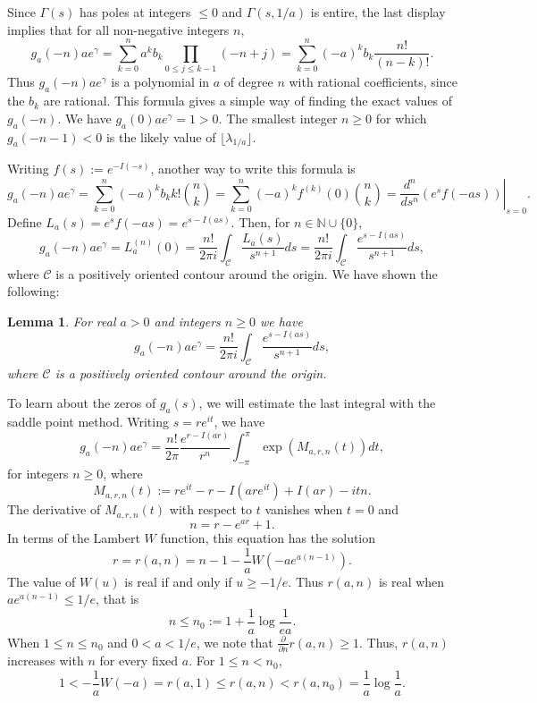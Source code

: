 \documentclass[11pt]{amsart}
\newtheorem{lemma}{Lemma}
\begin{document}
Since $\Gamma(s)$ has poles at integers $\le 0$ and $\Gamma(s,1/a)$ is entire, the last display implies that for all non-negative integers $n$,
\begin{equation}\label{gapoly}
g_a(-n) a e^\gamma = \sum_{k=0}^n a^k b_k \prod_{0\le j \le k-1} (-n+j) =  \sum_{k=0}^n (-a)^k b_k \frac{n!}{(n-k)!} .
\end{equation}
Thus $g_a(-n) a e^\gamma$ is a polynomial in $a$ of degree $n$ with rational coefficients, since the $b_k$ are rational.
This formula gives a simple way of finding the exact values of $g_a(-n)$. We have $g_a(0) a e^\gamma =1 > 0$. The smallest integer $n\ge 0$ for which $g_a(-n-1)<0$
is the likely value of $\lfloor \lambda_{1/a} \rfloor$. 

Writing $f(s):=e^{-I(-s)}$, another way to write this formula is 
$$
g_a(-n) a e^\gamma = \sum_{k=0}^n (-a)^k b_k k! \binom{n}{k}=   \sum_{k=0}^n (-a)^k f^{(k)}(0)  \binom{n}{k} 
=\left. \frac{d^n}{ds^n} \left( e^s f(-as) \right) \right|_{s=0}.
$$
Define $L_a(s) = e^s f(-as) = e^{s-I(as)}$. Then, for $n\in \mathbb{N}\cup\{0\}$,
$$
g_a(-n) a e^\gamma =L_a^{(n)}(0) = \frac{n!}{2\pi i} \int_{\mathcal{C}} \frac{L_a(s)}{s^{n+1}} ds =  \frac{n!}{2\pi i} \int_{\mathcal{C}}  \frac{e^{s-I(as)}}{s^{n+1}} ds,
$$
where ${\mathcal{C}} $ is a positively oriented contour around the origin. 
We have shown the following:

\begin{lemma}
For real $a>0$ and integers $n\ge 0$ we have
$$
g_a(-n) a e^\gamma = \frac{n!}{2\pi i} \int_{\mathcal{C}}  \frac{e^{s-I(as)}}{s^{n+1}} ds,
$$
where ${\mathcal{C}} $ is a positively oriented contour around the origin. 
\end{lemma}

To learn about the zeros of $g_a(s)$, we will estimate the last integral with the saddle point method.
Writing $s=r e^{i t}$, we have
\begin{equation}\label{gacint}
 g_a(-n) a e^\gamma 
= \frac{n!}{2\pi } \frac{e^{r-I(ar)}}{r^n}  \int_{-\pi}^\pi \exp\left(M_{a,r,n}(t)\right)dt,
\end{equation}
for integers $n\ge 0$, where
$$
M_{a,r,n}(t):=r e^{it} - r -I(are^{it})+I(ar) -i t  n .
$$
The derivative of $M_{a,r,n}(t)$ with respect to $t$ vanishes when $t=0$ and 
\begin{equation}\label{nrdef}
n= r-e^{ar}+1 .
\end{equation}
In terms of the Lambert $W$ function, this equation has the solution
\begin{equation}\label{rdef}
r=r(a,n)=n-1-\frac{1}{a} W(-a e^{a(n-1)}).
\end{equation}
The value of $W(u)$ is real if and only if $u\ge -1/e$. Thus $r(a,n)$ is real when $a e^{a(n-1)} \le 1/e$, that is 
$$
n \le n_0:= 1 + \frac{1}{a} \log \frac{1}{ea}.
$$
When $1\le n \le n_0$ and $0<a<1/e$, we note that $\frac{\partial}{\partial n}r(a,n) \ge 1$. 
Thus, $r(a,n)$ increases with $n$ for every fixed $a$. For $ 1 \le n < n_0$,
\begin{equation}\label{rub}
1< -\frac{1}{a} W(-a)=r(a,1) \le r(a,n) < r(a,n_0) = \frac{1}{a} \log \frac{1}{a}.
\end{equation}
\end{document}
